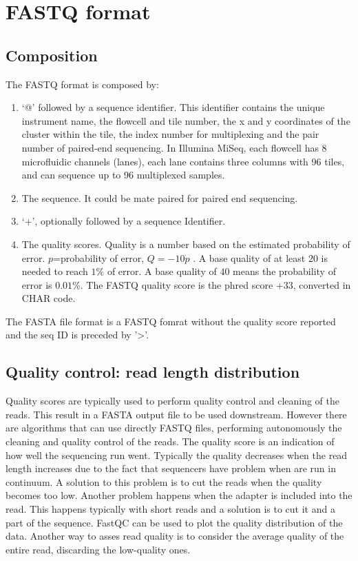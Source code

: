 \section{FASTQ format}

	\subsection{Composition}
	The FASTQ format is composed by:

	\begin{multicols}{2}
		\begin{enumerate}
			\item ‘@’ followed by a sequence identifier.
				This identifier contains the unique instrument name, the flowcell and tile number, the x and y coordinates of the cluster within the tile, the index number for multiplexing and the pair number of paired-end sequencing.
				In Illumina MiSeq, each flowcell has 8 microfluidic channels (lanes), each lane contains three columns with 96 tiles, and can sequence up to 96 multiplexed samples.
			\item The sequence. It could be mate paired for paired end sequencing.
			\item ‘+’, optionally followed by a sequence Identifier.
			\item The quality scores.
				Quality is a number based on the estimated probability of error.
				$p$=probability  of error, $Q = -10 \dot p$ .
				A base quality of at least $20$ is needed to reach  $1\%$ of error.
				A base quality of $40$ means the probability of error is $0.01\%$.
				The FASTQ quality score is the phred score +33, converted in CHAR code.
		\end{enumerate}
	\end{multicols}

	The FASTA file format is a FASTQ fomrat without the quality score reported and the seq ID is preceded by '>'.

	\subsection{Quality control: read length distribution}
	Quality scores are typically used to perform quality control and cleaning of the reads.
	This result in a FASTA output file to be used downstream.
	However there are algorithms that can use directly FASTQ files, performing autonomously the cleaning and quality control of the reads.
	The quality score is an indication of how well the sequencing run went.
	Typically the quality decreases when the read length increases due to the fact that sequencers have problem when are run in continuum.
	A solution to this problem is to cut the reads when the quality becomes too low.
	Another problem happens when the adapter is included into the read.
	This happens typically with short reads and a solution is to cut it and a part of the sequence.
	FastQC can be used to plot the quality distribution of the data.
	Another way to asses read quality is to consider the average quality of the entire read, discarding the low-quality ones.


